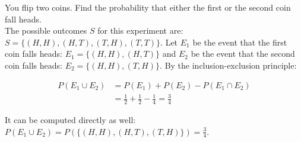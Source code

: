 \begin{texample}
	You flip two coins. Find the probability that either the first or the second coin fall heads. \\
	
	The possible outcomes $S$ for this experiment are: $S=\{(H, H), (H, T), (T, H), (T,T)\}$. Let $E_1$ be the event that the first coin falls heads: $E_1=\{(H, H), (H, T)\}$ and $E_2$ be the event that the second
	coin falls heads: $E_2=\{(H, H), (T, H)\}$. By the inclusion-exclusion principle:
	
	\begin{align*}
		P(E_1 \cup E_2) &= P(E_1) + P(E_2) - P(E_1 \cap E_2) \\
		&= \frac{1}{2}+\frac{1}{2}-\frac{1}{4}=\frac{3}{4}
	\end{align*}
	
	It can be computed directly as well: $P(E_1 \cup E_2)=P(\{(H, H), (H, T), (T, H)\})=\frac{3}{4}$.
\end{texample}

